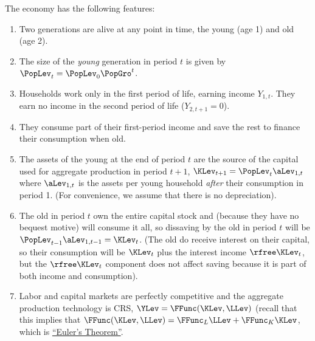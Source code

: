 \documentclass{handout}
\begin{document}
The economy has the following features:
\begin{enumerate}

\item Two generations are alive at any point in time, the young (age 1) and old (age 2).

\item The size of the {\it young} generation in period $t$ is given by 
$\PopLev_{t}=\PopLev_{0}\PopGro^{t}$.

\item Households work only in the first period of life, earning income $Y_{1,t}$.  They
earn no income in the second period of life ($Y_{2,t+1}=0$).

\item They consume part of their first-period income and save the rest to finance their 
consumption when old.

\item The assets of the young at the end of period $t$ are the source of the 
capital used for aggregate production in period $t+1$, $\KLev_{t+1} = 
\PopLev_{t}{\aLev}_{1,t}$ where ${\aLev}_{1,t}$ is the assets per young household {\it after} their
consumption in period 1.  (For convenience, we assume that there is no depreciation).  

\item {}  The old in period $t$ own the entire capital stock and (because they have 
no bequest motive) will consume it all, so dissaving by the old in 
period $t$ will be $\PopLev_{t-1}{\aLev}_{1,t-1} = \KLev_{t}$.  (The old do receive
interest on their capital, so their consumption will be $\KLev_{t}$ plus
the interest income $\rfree \KLev_{t}$, but the $\rfree \KLev_{t}$ component does not 
affect saving because it is part of both income and consumption).

\item Labor and capital markets are perfectly
competitive and the aggregate production technology is CRS, $\YLev=\FFunc(\KLev,\LLev)$
(recall that this implies that $\FFunc(\KLev,\LLev) = \FFunc_{L}\LLev + \FFunc_{K}\KLev$,
which is \href{https://www.econ2.jhu.edu/people/ccarroll/public/LectureNotes/MathFacts/MathFactsList/#EulersTheorem}{``Euler's Theorem''}.

\end{enumerate}
\end{document}

